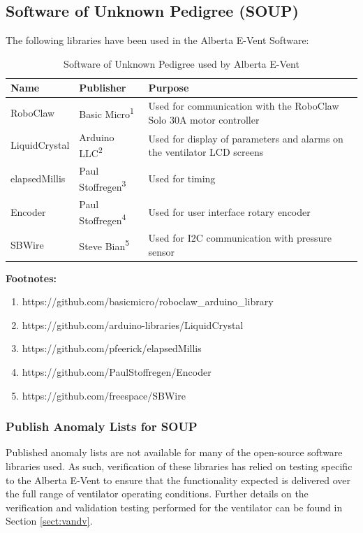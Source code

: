 \documentclass[]{article}
\begin{document}
\subsection{Software of Unknown Pedigree (SOUP)}
\label{sect:soup}

The following libraries have been used in the Alberta E-Vent Software:

\begin{center}
	\begin{table}[h]
		\caption{Software of Unknown Pedigree used by Alberta E-Vent}
		\label{tab:sw_soup}
		\begin{tabular}{ |p{3cm}|p{3cm}|p{8cm}|}
			
			\hline
			\textbf{Name} & \textbf{Publisher} & \textbf{Purpose}  \\ \hline
			RoboClaw & Basic Micro\textsuperscript{1} & Used for communication with the RoboClaw Solo 30A motor controller \\ \hline
			LiquidCrystal & Arduino LLC\textsuperscript{2} & Used for display of parameters and alarms on the ventilator LCD screens\\ \hline
			elapsedMillis & Paul Stoffregen\textsuperscript{3} & Used for timing\\ \hline
			Encoder & Paul Stoffregen\textsuperscript{4} & Used for user interface rotary encoder\\ \hline
			SBWire & Steve Bian\textsuperscript{5} & Used for I2C communication with pressure sensor\\ \hline			
		\end{tabular}
	
	\noindent \textbf{Footnotes:}
	\begin{enumerate}
		\item https://github.com/basicmicro/roboclaw\_arduino\_library
		\item https://github.com/arduino-libraries/LiquidCrystal
		\item https://github.com/pfeerick/elapsedMillis
		\item https://github.com/PaulStoffregen/Encoder
		\item https://github.com/freespace/SBWire
	\end{enumerate}
\end{table}	
\end{center}



\subsubsection{Publish Anomaly Lists for SOUP}
Published anomaly lists are not available for many of the open-source software libraries used.  As such, verification of these libraries has relied on testing specific to the Alberta E-Vent to ensure that the functionality expected is delivered over the full range of ventilator operating conditions.  Further details on the verification and validation testing performed for the ventilator can be found in Section \ref{sect:vandv}.
\end{document}
